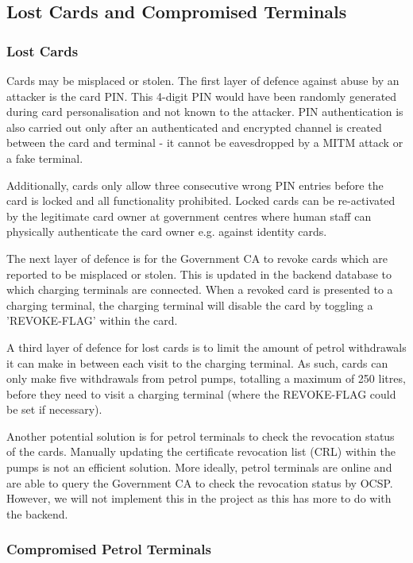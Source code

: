 \documentclass[a4paper,10pt]{llncs}
\begin{document}
\subsection{Lost Cards and Compromised Terminals}
\label{section:lost}
\subsubsection{Lost Cards}
Cards may be misplaced or stolen. The first layer of defence against abuse by an attacker is the card PIN. This 4-digit PIN would have been randomly generated during card personalisation and not known to the attacker. PIN authentication is also carried out only after an authenticated and encrypted channel is created between the card and terminal - it cannot be eavesdropped by a MITM attack or a fake terminal.

Additionally, cards only allow three consecutive wrong PIN entries before the card is locked and all functionality prohibited. Locked cards can be re-activated by the legitimate card owner at government centres where human staff can physically authenticate the card owner e.g. against identity cards.

The next layer of defence is for the Government CA to revoke cards which are reported to be misplaced or stolen. This is updated in the backend database to which charging terminals are connected. When a revoked card is presented to a charging terminal, the charging terminal will disable the card by toggling a 'REVOKE-FLAG' within the card.

A third layer of defence for lost cards is to limit the amount of petrol withdrawals it can make in between each visit to the charging terminal. As such, cards can only make five withdrawals from petrol pumps, totalling a maximum of 250 litres, before they need to visit a charging terminal (where the REVOKE-FLAG could be set if necessary).

Another potential solution is for petrol terminals to check the revocation status of the cards. Manually updating the certificate revocation list (CRL) within the pumps is not an efficient solution. More ideally, petrol terminals are online and are able to query the Government CA to check the revocation status by OCSP. However, we will not implement this in the project as this has more to do with the backend.

\subsubsection{Compromised Petrol Terminals}
\end{document}
